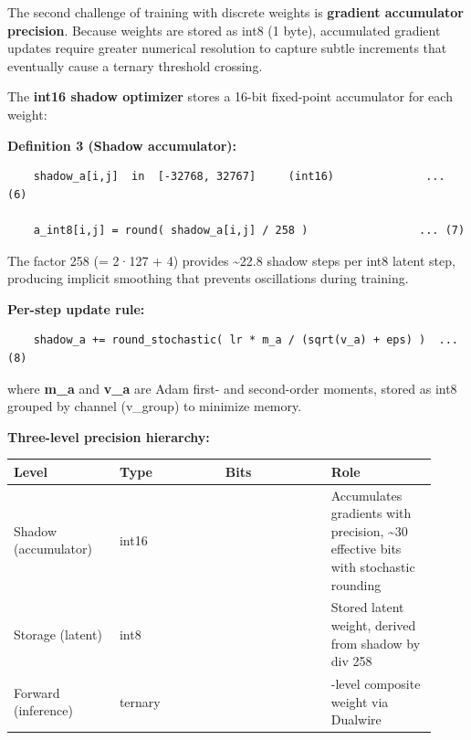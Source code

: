 The second challenge of training with discrete weights is
\textbf{gradient accumulator precision}. Because weights are stored as
int8 (1 byte), accumulated gradient updates require greater numerical
resolution to capture subtle increments that eventually cause a ternary
threshold crossing.

The \textbf{int16 shadow optimizer} stores a 16-bit fixed-point
accumulator for each weight:

\textbf{Definition 3 (Shadow accumulator):}

\begin{verbatim}
    shadow_a[i,j]  in  [-32768, 32767]     (int16)              ... (6)

    a_int8[i,j] = round( shadow_a[i,j] / 258 )                 ... (7)
\end{verbatim}

The factor 258 (= 2·127 + 4) provides \textasciitilde22.8 shadow steps
per int8 latent step, producing implicit smoothing that prevents
oscillations during training.

\textbf{Per-step update rule:}

\begin{verbatim}
    shadow_a += round_stochastic( lr * m_a / (sqrt(v_a) + eps) )  ... (8)
\end{verbatim}

where \textbf{m\_a} and \textbf{v\_a} are Adam first- and second-order
moments, stored as int8 grouped by channel (v\_group) to minimize
memory.

\textbf{Three-level precision hierarchy:}

{\def\LTcaptype{none} %
{\footnotesize\setlength{\tabcolsep}{3pt}
\begin{longtable}[]{@{}>{\raggedright\arraybackslash}p{0.230\linewidth}>{\raggedright\arraybackslash}p{0.230\linewidth}>{\raggedright\arraybackslash}p{0.230\linewidth}>{\raggedright\arraybackslash}p{0.230\linewidth}@{}}
\toprule\noalign{}
Level & Type & Bits & Role \\
\midrule\noalign{}
\endhead
\bottomrule\noalign{}
\endlastfoot
Shadow (accumulator) & int16 & 16 & Accumulates gradients with
precision, \textasciitilde30 effective bits with stochastic rounding \\
Storage (latent) & int8 & 8 & Stored latent weight, derived from shadow
by div 258 \\
Forward (inference) & ternary & 3.17 & 9-level composite weight via
Dualwire \\
\end{longtable}
}
}

